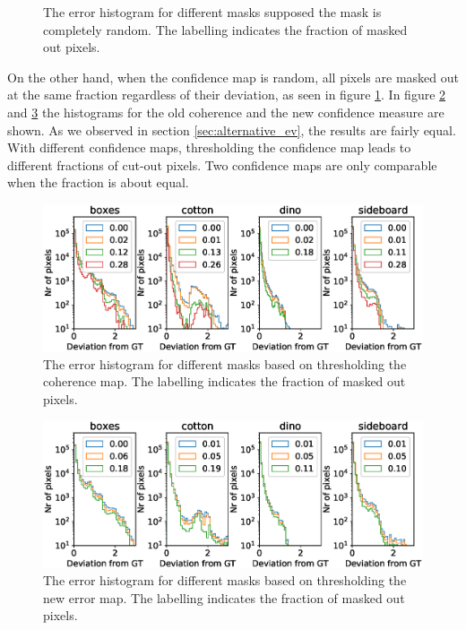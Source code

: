\documentclass  [
  paper    = a4,
  BCOR     = 10mm,
  twoside,
  fontsize = 12pt,
  fleqn,
  toc      = bibnumbered,
  toc      = listofnumbered,
  numbers  = noendperiod,
  headings = normal,
  listof   = leveldown,
  version  = 3.03
]                                       {scrreprt}
\begin{document}
\begin{appendix}
\begin{figure}[h!]
	\caption[Histogram when masking errors with new error map]{The error histogram for different masks supposed the mask is completely random. The labelling indicates the fraction of masked out pixels.}
	\label{fig:histogramerrormaskrandom}
\end{figure}
On the other hand, when the confidence map is random, all pixels are masked out at the same fraction regardless of their deviation, as seen in figure \ref{fig:histogramerrormaskrandom}.
In figure \ref{fig:histogramerrormaskold} and \ref{fig:histogramerrormasknewerr} the histograms for the old coherence and the new confidence measure are shown. As we observed in section \ref{sec:alternative_ev}, the results are fairly equal. With different confidence maps, thresholding the confidence map leads to different fractions of cut-out pixels. Two confidence maps are only comparable when the fraction is about equal. 
\begin{figure}[h!]
	\centering
	\includegraphics[width=0.8\linewidth]{images/histogram_error_mask_old}
	\caption[Histogram when masking errors]{The error histogram for different masks based on thresholding the coherence map. The labelling indicates the fraction of masked out pixels.}
	\label{fig:histogramerrormaskold}
\end{figure}
\begin{figure}[h!]
	\centering
	\includegraphics[width=0.8\linewidth]{images/histogram_error_mask_new_err}
	\caption[Histogram when masking errors with new error map]{The error histogram for different masks based on thresholding the new error map. The labelling indicates the fraction of masked out pixels.}
	\label{fig:histogramerrormasknewerr}
\end{figure}


\end{appendix}
\end{document}
